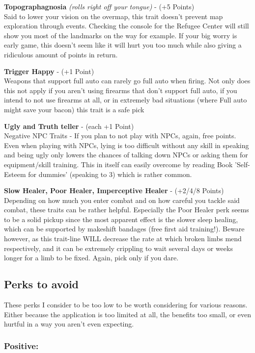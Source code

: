 \textbf{Topographagnosia} \textit{(rolls right off your tongue)} - (+5 Points)\\Said to lower your vision on the overmap, this trait doesn't prevent map exploration through events. Checking the console for the Refugee Center will still show you most of the landmarks on the way for example. If your big worry is early game, this doesn't seem like it will hurt you too much while also giving a ridiculous amount of points in return.

\textbf{Trigger Happy} - (+1 Point)\\Weapons that support full auto can rarely go full auto when firing. Not only does this not apply if you aren't using firearms that don't support full auto, if you intend to not use firearms at all, or in extremely bad situations (where Full auto might save your bacon) this trait is a safe pick

\textbf{Ugly and Truth teller} - (each +1 Point)\\Negative NPC Traits - If you plan to not play with NPCs, again, free points. Even when playing with NPCs, lying is too difficult without any skill in speaking and being ugly only lowers the chances of talking down NPCs or asking them for equipment/skill training. This in itself can easily overcome by reading Book 'Self-Esteem for dummies' (speaking to 3) which is rather common.

\textbf{Slow Healer, Poor Healer, Imperceptive Healer} - (+2/4/8 Points)\\Depending on how much you enter combat and on how careful you tackle said combat, these traits can be rather helpful. Especially the Poor Healer perk seems to be a solid pickup since the most apparent effect is the slower sleep healing, which can be supported by makeshift bandages (free first aid training!). Beware however, as this trait-line WILL decrease the rate at which broken limbs mend respectively, and it can be extremely crippling to wait several days or weeks longer for a limb to be fixed. Again, pick only if you dare.

\subsection{Perks to avoid}
These perks I consider to be too low to be worth considering for various reasons. Either because the application is too limited at all, the benefits too small, or even hurtful in a way you aren't even expecting.

\subsubsection{Positive:}


